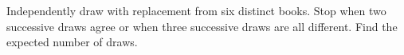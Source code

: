 Independently draw with replacement from six distinct books. Stop when two successive draws agree or when three successive draws are all different. Find the expected number of draws.
